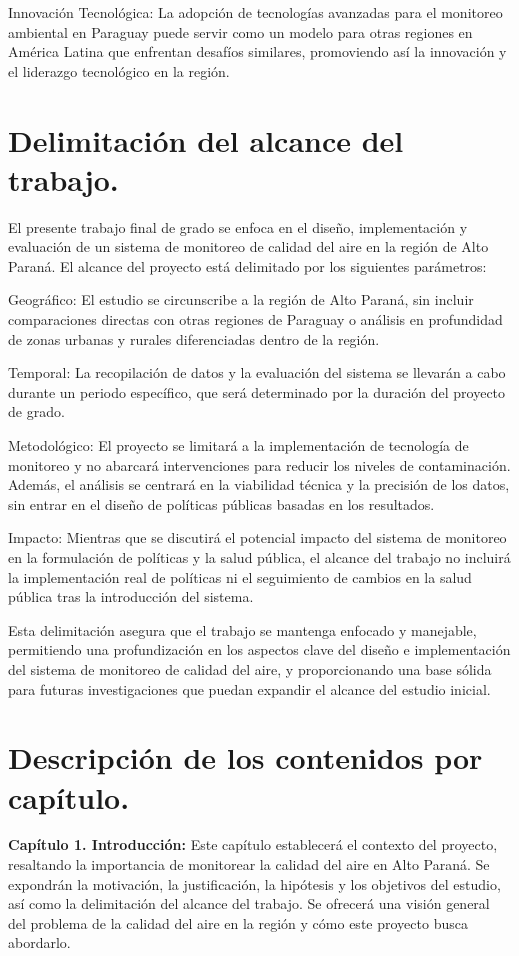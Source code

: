 Innovación Tecnológica: La adopción de tecnologías avanzadas para el monitoreo ambiental en Paraguay puede servir como un modelo para otras regiones en América Latina que enfrentan desafíos similares, promoviendo así la innovación y el liderazgo tecnológico en la región.

\section{Delimitación del alcance del trabajo.}

El presente trabajo final de grado se enfoca en el diseño, implementación y evaluación de un sistema de monitoreo de calidad del aire en la región de Alto Paraná. El alcance del proyecto está delimitado por los siguientes parámetros:

Geográfico: El estudio se circunscribe a la región de Alto Paraná, sin incluir comparaciones directas con otras regiones de Paraguay o análisis en profundidad de zonas urbanas y rurales diferenciadas dentro de la región.

Temporal: La recopilación de datos y la evaluación del sistema se llevarán a cabo durante un periodo específico, que será determinado por la duración del proyecto de grado.

Metodológico: El proyecto se limitará a la implementación de tecnología de monitoreo y no abarcará intervenciones para reducir los niveles de contaminación. Además, el análisis se centrará en la viabilidad técnica y la precisión de los datos, sin entrar en el diseño de políticas públicas basadas en los resultados.

Impacto: Mientras que se discutirá el potencial impacto del sistema de monitoreo en la formulación de políticas y la salud pública, el alcance del trabajo no incluirá la implementación real de políticas ni el seguimiento de cambios en la salud pública tras la introducción del sistema.

Esta delimitación asegura que el trabajo se mantenga enfocado y manejable, permitiendo una profundización en los aspectos clave del diseño e implementación del sistema de monitoreo de calidad del aire, y proporcionando una base sólida para futuras investigaciones que puedan expandir el alcance del estudio inicial.



\section{Descripción de los contenidos por capítulo.} 
	\item \textbf{Capítulo 1. Introducción: }Este capítulo establecerá el contexto del proyecto, resaltando la importancia de monitorear la calidad del aire en Alto Paraná. Se expondrán la motivación, la justificación, la hipótesis y los objetivos del estudio, así como la delimitación del alcance del trabajo. Se ofrecerá una visión general del problema de la calidad del aire en la región y cómo este proyecto busca abordarlo.
 
